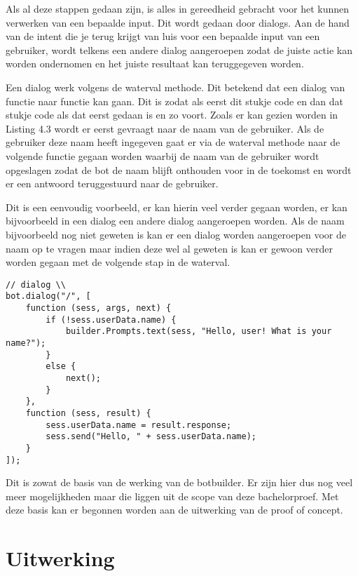 Als al deze stappen gedaan zijn, is alles in gereedheid gebracht voor het kunnen verwerken van een bepaalde input. Dit wordt gedaan door dialogs. Aan de hand van de intent die je terug krijgt van luis voor een bepaalde input van een gebruiker, wordt telkens een andere dialog aangeroepen zodat de juiste actie kan worden ondernomen en het juiste resultaat kan teruggegeven worden.

Een dialog werk volgens de waterval methode. Dit betekend dat een dialog van functie naar functie kan gaan. Dit is zodat als eerst dit stukje code en dan dat stukje code als dat eerst gedaan is en zo voort. Zoals er kan gezien worden in Listing 4.3 wordt er eerst gevraagt naar de naam van de gebruiker. Als de gebruiker deze naam heeft ingegeven gaat er via de waterval methode naar de volgende functie gegaan worden waarbij de naam van de gebruiker wordt opgeslagen zodat de bot de naam blijft onthouden voor in de toekomst en wordt er een antwoord teruggestuurd naar de gebruiker.

Dit is een eenvoudig voorbeeld, er kan hierin veel verder gegaan worden, er kan bijvoorbeeld in een dialog een andere dialog aangeroepen worden. Als de naam bijvoorbeeld nog niet geweten is kan er een dialog worden aangeroepen voor de naam op te vragen maar indien deze wel al geweten is kan er gewoon verder worden gegaan met de volgende stap in de waterval.

\medskip
\begin{lstlisting}[caption=Waterval methode]
// dialog \\
bot.dialog("/", [
	function (sess, args, next) {
		if (!sess.userData.name) {
			builder.Prompts.text(sess, "Hello, user! What is your name?");
		}
		else {
			next();
		}
	},
	function (sess, result) {
		sess.userData.name = result.response;
		sess.send("Hello, " + sess.userData.name);
	}
]);
\end{lstlisting}

Dit is zowat de basis van de werking van de botbuilder. Er zijn hier dus nog veel meer mogelijkheden maar die liggen uit de scope van deze bachelorproef. Met deze basis kan er begonnen worden aan de uitwerking van de proof of concept.

\section{Uitwerking}
\label{sec:Uitwerking}

